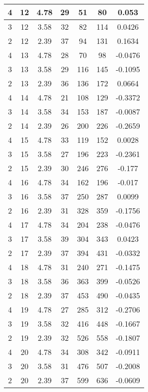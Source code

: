 \documentclass[letterpaper, 12pt]{article}
\begin{document}
\begin{longtable}{|c|c|c|c|c|c|c|}
\hline
4 & 12 & 4.78 & 29 & 51 & 80 & 0.053 \\
\hline
3 & 12 & 3.58 & 32 & 82 & 114 & 0.0426 \\
\hline
2 & 12 & 2.39 & 37 & 94 & 131 & 0.1634 \\
\hline
4 & 13 & 4.78 & 28 & 70 & 98 & -0.0476 \\
\hline
3 & 13 & 3.58 & 29 & 116 & 145 & -0.1095 \\
\hline
2 & 13 & 2.39 & 36 & 136 & 172 & 0.0664 \\
\hline
4 & 14 & 4.78 & 21 & 108 & 129 & -0.3372 \\
\hline
3 & 14 & 3.58 & 34 & 153 & 187 & -0.0087 \\
\hline
2 & 14 & 2.39 & 26 & 200 & 226 & -0.2659 \\
\hline
4 & 15 & 4.78 & 33 & 119 & 152 & 0.0028 \\
\hline
3 & 15 & 3.58 & 27 & 196 & 223 & -0.2361 \\
\hline
2 & 15 & 2.39 & 30 & 246 & 276 & -0.177 \\
\hline
4 & 16 & 4.78 & 34 & 162 & 196 & -0.017 \\
\hline
3 & 16 & 3.58 & 37 & 250 & 287 & 0.0099 \\
\hline
2 & 16 & 2.39 & 31 & 328 & 359 & -0.1756 \\
\hline
4 & 17 & 4.78 & 34 & 204 & 238 & -0.0476 \\
\hline
3 & 17 & 3.58 & 39 & 304 & 343 & 0.0423 \\
\hline
2 & 17 & 2.39 & 37 & 394 & 431 & -0.0332 \\
\hline
4 & 18 & 4.78 & 31 & 240 & 271 & -0.1475 \\
\hline
3 & 18 & 3.58 & 36 & 363 & 399 & -0.0526 \\
\hline
2 & 18 & 2.39 & 37 & 453 & 490 & -0.0435 \\
\hline
4 & 19 & 4.78 & 27 & 285 & 312 & -0.2706 \\
\hline
3 & 19 & 3.58 & 32 & 416 & 448 & -0.1667 \\
\hline
2 & 19 & 2.39 & 32 & 526 & 558 & -0.1807 \\
\hline
4 & 20 & 4.78 & 34 & 308 & 342 & -0.0911 \\
\hline
3 & 20 & 3.58 & 31 & 476 & 507 & -0.2008 \\
\hline
2 & 20 & 2.39 & 37 & 599 & 636 & -0.0609 \\
\hline
\end{longtable}
\end{document}
